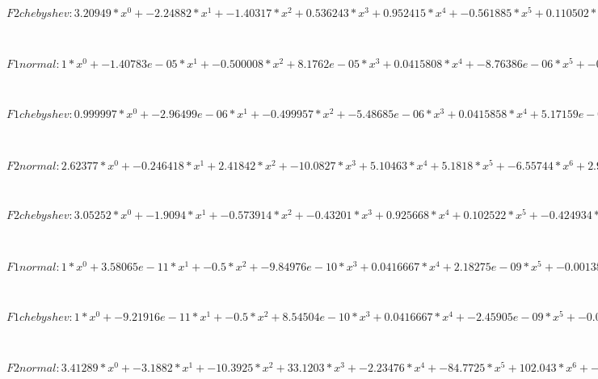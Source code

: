 \documentclass[]{article}
\begin{document}
~

$F2 chebyshev : 3.20949 * x^0 + -2.24882 * x^1 + -1.40317 * x^2 + 0.536243 * x^3 + 0.952415 * x^4 + -0.561885 * x^5 + 0.110502 * x^6 + -0.00746209*x^7
$

~

$F1 normal : 1 * x^0 + -1.40783e-05 * x^1 + -0.500008 * x^2 + 8.1762e-05 * x^3 + 0.0415808 * x^4 + -8.76386e-06 * x^5 + -0.00131798 * x^6 + -5.46073e-05 * x^7 + 4.51753e-05 * x^8 + -4.06391e-06 * x^9 + 9.86604e-08*x^10
$

~

$F1 chebyshev : 0.999997 * x^0 + -2.96499e-06 * x^1 + -0.499957 * x^2 + -5.48685e-06 * x^3 + 0.0415858 * x^4 + 5.17159e-05 * x^5 + -0.00136291 * x^6 + -4.01683e-05 * x^7 + 4.28644e-05 * x^8 + -3.89478e-06 * x^9 + 9.49605e-08*x^10
$

~

$F2 normal : 2.62377 * x^0 + -0.246418 * x^1 + 2.41842 * x^2 + -10.0827 * x^3 + 5.10463 * x^4 + 5.1818 * x^5 + -6.55744 * x^6 + 2.96834 * x^7 + -0.684168 * x^8 + 0.0803939 * x^9 + -0.00382828*x^10
$

~

$F2 chebyshev : 3.05252 * x^0 + -1.9094 * x^1 + -0.573914 * x^2 + -0.43201 * x^3 + 0.925668 * x^4 + 0.102522 * x^5 + -0.424934 * x^6 + 0.198172 * x^7 + -0.0423206 * x^8 + 0.00445957 * x^9 + -0.000188239*x^10
$

~

$F1 normal : 1 * x^0 + 3.58065e-11 * x^1 + -0.5 * x^2 + -9.84976e-10 * x^3 + 0.0416667 * x^4 + 2.18275e-09 * x^5 + -0.00138889 * x^6 + 1.71184e-09 * x^7 + 2.48031e-05 * x^8 + -2.43119e-09 * x^9 + -2.74062e-07 * x^10 + -5.13802e-10 * x^11 + 2.17634e-09 * x^12 + -4.21017e-13 * x^13 + -1.4612e-11 * x^14 + 6.291e-13*x^15
$

~

$F1 chebyshev : 1 * x^0 + -9.21916e-11 * x^1 + -0.5 * x^2 + 8.54504e-10 * x^3 + 0.0416667 * x^4 + -2.45905e-09 * x^5 + -0.00138889 * x^6 + 2.59067e-09 * x^7 + 2.48e-05 * x^8 + -4.5181e-10 * x^9 + -2.74668e-07 * x^10 + -4.38791e-10 * x^11 + 2.18339e-09 * x^12 + -4.02671e-12 * x^13 + -1.41595e-11 * x^14 + 6.08831e-13*x^15
$

~

$F2 normal : 3.41289 * x^0 + -3.1882 * x^1 + -10.3925 * x^2 + 33.1203 * x^3 + -2.23476 * x^4 + -84.7725 * x^5 + 102.043 * x^6 + -17.6007 * x^7 + -56.5271 * x^8 + 60.2502 * x^9 + -31.2599 * x^10 + 9.93164 * x^11 + -2.02235 * x^12 + 0.258635 * x^13 + -0.0189806 * x^14 + 0.000611066*x^15
$
\end{document}
